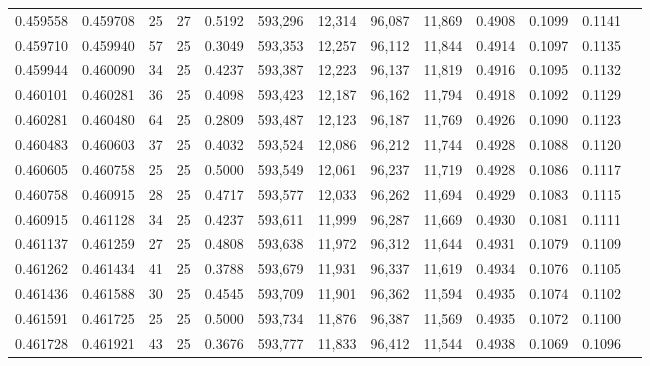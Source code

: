 \begin{tabular}{rrrrrrrrrrrrr}
0.459558 & 0.459708 &    25 &  27 &                                     0.5192 & 593,296 &  12,314 &  96,087 &  11,869 & 0.4908 & 0.1099 & 0.1141 \\
0.459710 & 0.459940 &    57 &  25 &                                     0.3049 & 593,353 &  12,257 &  96,112 &  11,844 & 0.4914 & 0.1097 & 0.1135 \\
0.459944 & 0.460090 &    34 &  25 &                                     0.4237 & 593,387 &  12,223 &  96,137 &  11,819 & 0.4916 & 0.1095 & 0.1132 \\
0.460101 & 0.460281 &    36 &  25 &                                     0.4098 & 593,423 &  12,187 &  96,162 &  11,794 & 0.4918 & 0.1092 & 0.1129 \\
0.460281 & 0.460480 &    64 &  25 &                                     0.2809 & 593,487 &  12,123 &  96,187 &  11,769 & 0.4926 & 0.1090 & 0.1123 \\
0.460483 & 0.460603 &    37 &  25 &                                     0.4032 & 593,524 &  12,086 &  96,212 &  11,744 & 0.4928 & 0.1088 & 0.1120 \\
0.460605 & 0.460758 &    25 &  25 &                                     0.5000 & 593,549 &  12,061 &  96,237 &  11,719 & 0.4928 & 0.1086 & 0.1117 \\
0.460758 & 0.460915 &    28 &  25 &                                     0.4717 & 593,577 &  12,033 &  96,262 &  11,694 & 0.4929 & 0.1083 & 0.1115 \\
0.460915 & 0.461128 &    34 &  25 &                                     0.4237 & 593,611 &  11,999 &  96,287 &  11,669 & 0.4930 & 0.1081 & 0.1111 \\
0.461137 & 0.461259 &    27 &  25 &                                     0.4808 & 593,638 &  11,972 &  96,312 &  11,644 & 0.4931 & 0.1079 & 0.1109 \\
0.461262 & 0.461434 &    41 &  25 &                                     0.3788 & 593,679 &  11,931 &  96,337 &  11,619 & 0.4934 & 0.1076 & 0.1105 \\
0.461436 & 0.461588 &    30 &  25 &                                     0.4545 & 593,709 &  11,901 &  96,362 &  11,594 & 0.4935 & 0.1074 & 0.1102 \\
0.461591 & 0.461725 &    25 &  25 &                                     0.5000 & 593,734 &  11,876 &  96,387 &  11,569 & 0.4935 & 0.1072 & 0.1100 \\
0.461728 & 0.461921 &    43 &  25 &                                     0.3676 & 593,777 &  11,833 &  96,412 &  11,544 & 0.4938 & 0.1069 & 0.1096 \\

\end{tabular}
